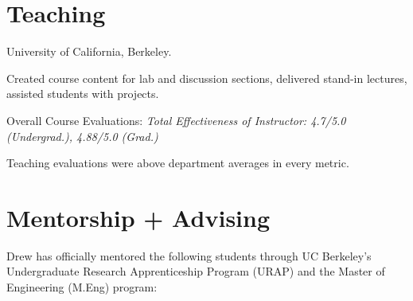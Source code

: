 \documentclass[letterpaper]{deedy-resume} %
\begin{document}

\section{Teaching}

\vspace{0.2cm}


{{} University of California, Berkeley.
  
\begin{tightitemize}
\item Created course content for lab and discussion sections, delivered stand-in lectures, assisted students with projects.
\item Overall Course Evaluations: {\it Total Effectiveness of Instructor: 4.7/5.0 (Undergrad.), 4.88/5.0 (Grad.)}
\item Teaching evaluations were above department averages in every metric.
\end{tightitemize}}

\vspace{0.2cm}




\section{Mentorship + Advising}

\vspace{0.2cm}

Drew has officially mentored the following students through UC Berkeley's Undergraduate Research Apprenticeship Program (URAP) and the Master of Engineering (M.Eng) program:

\end{document}
